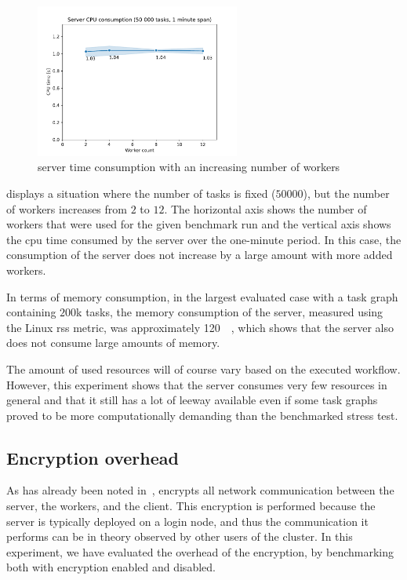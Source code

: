 \begin{figure}[h]
	\centering
	\includegraphics[width=0.6\textwidth]{imgs/hq/charts/server-utilization-workers}
	\caption{\hyperqueue{} server  time consumption with an increasing number
	of workers}
	\label{fig:hq-server-cpu-consumption-workers}
\end{figure}

 displays a situation where the number of tasks
is fixed ($50000$), but the number of workers increases from
$2$ to $12$. The horizontal axis shows the number of workers
that were used for the given benchmark run and the vertical axis shows the \gls{cpu}
time consumed by the server over the one-minute period. In this case, the consumption of the server
does not increase by a large amount with more added workers.

In terms of memory consumption, in the largest evaluated case with a task graph containing
$200$k tasks, the memory consumption of the server, measured using the Linux
\gls{rss} metric, was approximately \SI{120}{\mebi\byte}, which shows that the server
also does not consume large amounts of memory.

The amount of used resources will of course vary based on the executed workflow. However, this
experiment shows that the server consumes very few resources in general and that it still has a
lot of leeway available even if some task graphs proved to be more computationally demanding than
the benchmarked stress test.

\subsection{Encryption overhead}
\label{sec:hq-exp-encryption-overhead}
As has already been noted in~, \hyperqueue{} encrypts all network
communication between the server, the workers, and the client. This encryption is performed because
the server is typically deployed on a login node, and thus the communication it performs can be in
theory observed by other users of the cluster. In this experiment, we have evaluated the overhead
of the encryption, by benchmarking \hyperqueue{} both with encryption enabled and
disabled.


